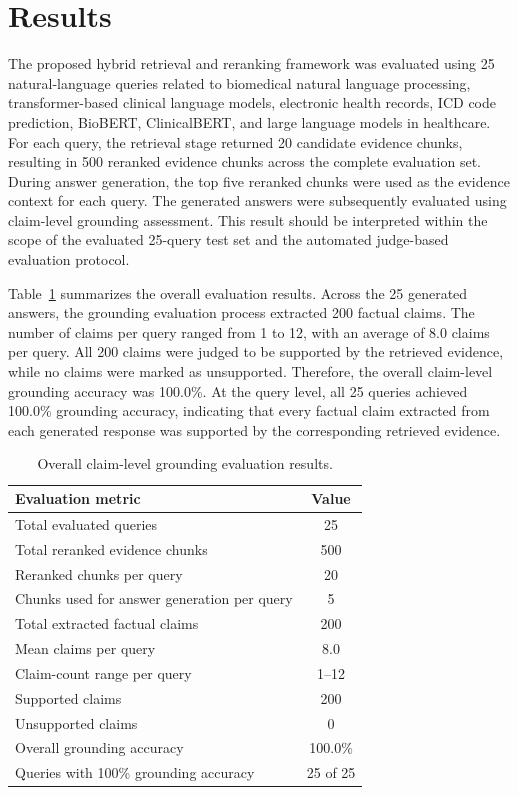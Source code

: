 \section{Results}

The proposed hybrid retrieval and reranking framework was evaluated using 25 natural-language queries related to biomedical natural language processing, transformer-based clinical language models, electronic health records, ICD code prediction, BioBERT, ClinicalBERT, and large language models in healthcare. For each query, the retrieval stage returned 20 candidate evidence chunks, resulting in 500 reranked evidence chunks across the complete evaluation set. During answer generation, the top five reranked chunks were used as the evidence context for each query. The generated answers were subsequently evaluated using claim-level grounding assessment. This result should be interpreted within the scope of the evaluated 25-query test set and the automated judge-based evaluation protocol.

Table~\ref{tab:overall_grounding_summary} summarizes the overall evaluation results. Across the 25 generated answers, the grounding evaluation process extracted 200 factual claims. The number of claims per query ranged from 1 to 12, with an average of 8.0 claims per query. All 200 claims were judged to be supported by the retrieved evidence, while no claims were marked as unsupported. Therefore, the overall claim-level grounding accuracy was 100.0\%. At the query level, all 25 queries achieved 100.0\% grounding accuracy, indicating that every factual claim extracted from each generated response was supported by the corresponding retrieved evidence.

\begin{table}[!t]
\centering
\caption{Overall claim-level grounding evaluation results.}
\label{tab:overall_grounding_summary}
\begin{tabular}{lc}
\hline
\textbf{Evaluation metric} & \textbf{Value} \\
\hline
Total evaluated queries & 25 \\
Total reranked evidence chunks & 500 \\
Reranked chunks per query & 20 \\
Chunks used for answer generation per query & 5 \\
Total extracted factual claims & 200 \\
Mean claims per query & 8.0 \\
Claim-count range per query & 1--12 \\
Supported claims & 200 \\
Unsupported claims & 0 \\
Overall grounding accuracy & 100.0\% \\
Queries with 100\% grounding accuracy & 25 of 25 \\
\hline
\end{tabular}
\end{table}

